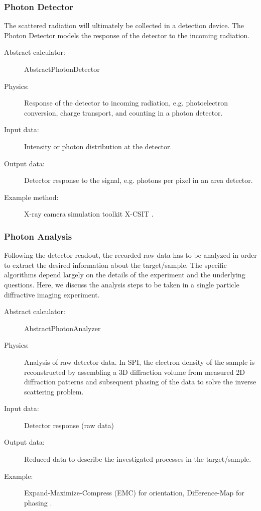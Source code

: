 \documentclass[a4paper]{article}
\begin{document}
\subsubsection{Photon Detector}
The scattered radiation will ultimately  be collected in a detection device. The Photon Detector models the response of the detector to the incoming
radiation.
\begin{description}
  \item[Abstract calculator:] AbstractPhotonDetector
  \item[Physics:] Response of the detector to incoming radiation, e.g. photoelectron conversion, charge transport, and counting in a photon detector.
  \item[Input data:] Intensity or photon distribution at the detector.
  \item[Output data:] Detector response to the signal, e.g. photons per pixel in an area detector.
  \item[Example method:] X-ray camera simulation toolkit X-CSIT \cite{Joy2015}.
\end{description}
%
\subsubsection{Photon Analysis}
Following the detector readout, the recorded raw data has to be analyzed in order to extract the desired information about the target/sample. The
specific algorithms depend largely on the details of the experiment and the underlying questions. Here, we discuss the analysis steps to be taken
in a single particle diffractive imaging experiment.
\begin{description}
  \item[Abstract calculator:] AbstractPhotonAnalyzer
  \item[Physics:]  Analysis of raw detector data. In SPI, the electron density of the sample is reconstructed by assembling a 3D diffraction volume
    from measured 2D diffraction patterns and subsequent phasing of the data to solve the inverse scattering problem.
  \item[Input data:] Detector response (raw data)
  \item[Output data:] Reduced data to describe the investigated processes in the target/sample.
  \item[Example:]  Expand-Maximize-Compress (EMC)  for orientation, Difference-Map for phasing \cite{Loh2009, s2e_recon_bitbucket}.
\end{description}
\end{document}

